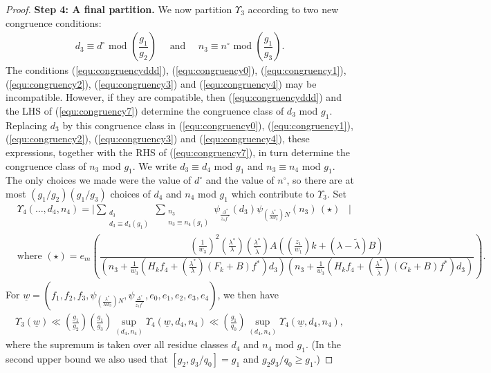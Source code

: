 \documentclass{amsart}
\numberwithin{equation}{section}
\begin{document}
\begin{proof}
\vspace{3mm}
\textbf{Step 4: A final partition.} 
 We now partition $\Upsilon_3$ according to two new congruence conditions: 
\begin{align} \label{equ:congruency7}
d_3 \equiv d^\circ \mbox{ mod } \left(\dfrac{g_1}{g_2} \right) \quad \mbox{ and }  \quad n_3 \equiv n^\circ \mbox{ mod } \left(\dfrac{g_1}{g_3} \right). 
\end{align}
The conditions (\ref{equ:congruencyddd}), (\ref{equ:congruency0}), (\ref{equ:congruency1}), (\ref{equ:congruency2}), (\ref{equ:congruency3}) and (\ref{equ:congruency4}) may be incompatible. However, if they are compatible, then  (\ref{equ:congruencyddd}) and the LHS of  (\ref{equ:congruency7}) determine the congruence class of $d_3$ mod $g_1$. Replacing $d_3$ by this congruence class in (\ref{equ:congruency0}), (\ref{equ:congruency1}), (\ref{equ:congruency2}), (\ref{equ:congruency3}) and (\ref{equ:congruency4}), these expressions, together with the RHS of (\ref{equ:congruency7}), in turn determine the congruence class of $n_3$ mod $g_1$. We write $d_3 \equiv d_4$ mod $g_1$ and $n_3 \equiv n_4$ mod $g_1$. The only choices we made were the value of $d^\circ$ and the value of $n^\circ$, so there are at most $(g_1/g_2)(g_1/g_3)$ choices of $d_4$ and $n_4$ mod $g_1$ which contribute to $\Upsilon_3$. Set 
 \begin{align*}
&\Upsilon_4(\dots,d_4,n_4) = \Bigg|\sum_{\substack{d_3 \\  d_3 \equiv d_4  (g_1) }}\sum_{\substack{n_3 \\   n_3 \equiv n_4   (g_1)   }}  \psi_{\frac{\Delta^*}{z_1 f^*}}(d_3)\psi_{(\frac{\lambda^*}{\lambda w_3})N}( n_3)\, (\star) \,\,\,\,\,\Bigg|
 \\
&\mbox{where } (\star) = e_{m}\left(\dfrac{(\frac{1}{w_3})^2(\frac{\lambda^*}{\lambda})(\frac{\lambda^*}{\widetilde{\lambda}})A ((\frac{z_1}{w_1}) k   +  (\lambda-\widetilde{\lambda})B)}{( n_3+\frac{1}{w_3}(H_kf_4 + (\frac{\lambda^*}{\lambda}) (F_k +B )f^*) d_3)(  n_3+\frac{1}{w_3}(H_kf_4 + ( \frac{\lambda^*}{\widetilde{\lambda}})(G_k+B) f^*) d_3)}\right).
\end{align*}
For $\underline{w}=(f_1,f_2,f_3,\psi_{(\frac{\lambda^*}{\lambda w_3})N},\psi_{\frac{\Delta^*}{z_1 f^*}},e_0,e_1,e_2,e_3,e_4)$, we then have
\begin{align}\label{chain4}
\Upsilon_3(\underline{w}) \ll \left(\frac{g_1}{g_2}\right)\left(\frac{g_1}{g_3}\right) \sup_{(d_4,n_4)} \Upsilon_4(\underline{w},d_4,n_4) \ll \left(\frac{g_1}{q_0}\right) \sup_{(d_4,n_4)} \Upsilon_4(\underline{w},d_4,n_4),
\end{align}
where the supremum is taken over all residue classes $d_4$ and $n_4$ mod $g_1$. (In the second upper bound we also used that  $[g_2, g_3/q_0]= g_1$ and $g_2g_3/q_0 \geq g_1$.)


\end{proof}
\end{document}
